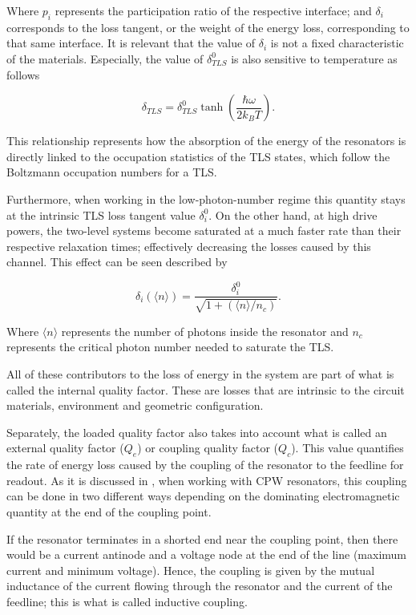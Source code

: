 \documentclass[12pt, a4paper]{article}
\begin{document}
Where $p_i$ represents the participation ratio of the respective interface; and $\delta_i$ corresponds to the loss tangent, or the weight of the energy loss, corresponding to that same interface. It is relevant that the value of $\delta_i$ is not a fixed characteristic of the materials. Especially, the value of $\delta^0_{TLS}$ is also sensitive to temperature as follows \cite{Gao2008}

\begin{equation}
    \label{delta(T)}
    \delta_{TLS} = \delta^0_{TLS} \tanh\left(\frac{\hbar \omega}{2 k_B T}\right).
\end{equation}

This relationship represents how the absorption of the energy of the resonators is directly linked to the occupation statistics of the TLS states, which follow the Boltzmann occupation numbers for a TLS.  

Furthermore, when working in the low-photon-number regime this quantity stays at the intrinsic TLS loss tangent value $\delta^0_i$. On the other hand, at high drive powers, the two-level systems become saturated at a much faster rate than their respective relaxation times; effectively decreasing the losses caused by this channel. This effect can be seen described by \cite{Gao2008}

\begin{equation}
\label{tls_saturation}
\delta_i(\langle n \rangle) = \frac{\delta_i^0}{\sqrt{1 + (\langle n \rangle/n_c)}}.
\end{equation}

Where $\langle n \rangle$ represents the number of photons inside the resonator and $n_c$ represents the critical photon number needed to saturate the TLS.

All of these contributors to the loss of energy in the system are part of what is called the internal quality factor. These are losses that are intrinsic to the circuit materials, environment and geometric configuration. 

Separately, the loaded quality factor also takes into account what is called an external quality factor ($Q_e$) or coupling quality factor ($Q_c$). This value quantifies the rate of energy loss caused by the coupling of the resonator to the feedline for readout. As it is discussed in \cite{Pozar2012}, when working with CPW resonators, this coupling can be done in two different ways depending on the dominating electromagnetic quantity at the end of the coupling point.

If the resonator terminates in a shorted end near the coupling point, then there would be a current antinode and a voltage node at the end of the line (maximum current and minimum voltage). Hence, the coupling is given by the mutual inductance of the current flowing through the resonator and the current of the feedline; this is what is called inductive coupling.
\end{document}
